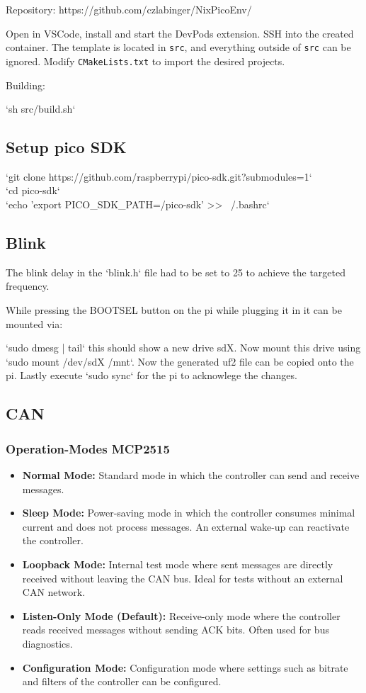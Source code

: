 Repository: https://github.com/czlabinger/NixPicoEnv/

Open in VSCode, install and start the DevPods extension. SSH into the created container.
The template is located in \texttt{src}, and everything outside of \texttt{src} can be ignored.
Modify \texttt{CMakeLists.txt} to import the desired projects.


Building: 

`sh src/build.sh`

\subsection{Setup pico SDK}
`git clone https://github.com/raspberrypi/pico-sdk.git?submodules=1`\mbox{}\\
`cd pico-sdk`\mbox{}\\
`echo 'export PICO\_SDK\_PATH=/pico-sdk' >> ~/.bashrc`\mbox{}\\

\subsection{Blink}

The blink delay in the `blink.h` file had to be set to 25 to achieve the targeted frequency.

While pressing the BOOTSEL button on the pi while plugging it in it can be mounted via:

`sudo dmesg | tail` this should show a new drive sdX. Now mount this drive using `sudo mount /dev/sdX /mnt`. Now the generated uf2 file can be copied onto the pi. Lastly execute `sudo sync` for the pi to acknowlege the changes.

\subsection{CAN}
\subsubsection{Operation-Modes MCP2515}
\begin{itemize}
  \item \textbf{Normal Mode:} Standard mode in which the controller can send and receive messages.
  \item \textbf{Sleep Mode:} Power-saving mode in which the controller consumes minimal current and does not process messages. An external wake-up can reactivate the controller.
  \item \textbf{Loopback Mode:} Internal test mode where sent messages are directly received without leaving the CAN bus. Ideal for tests without an external CAN network.
  \item \textbf{Listen-Only Mode (Default):} Receive-only mode where the controller reads received messages without sending ACK bits. Often used for bus diagnostics.
  \item \textbf{Configuration Mode:} Configuration mode where settings such as bitrate and filters of the controller can be configured.
\end{itemize}

